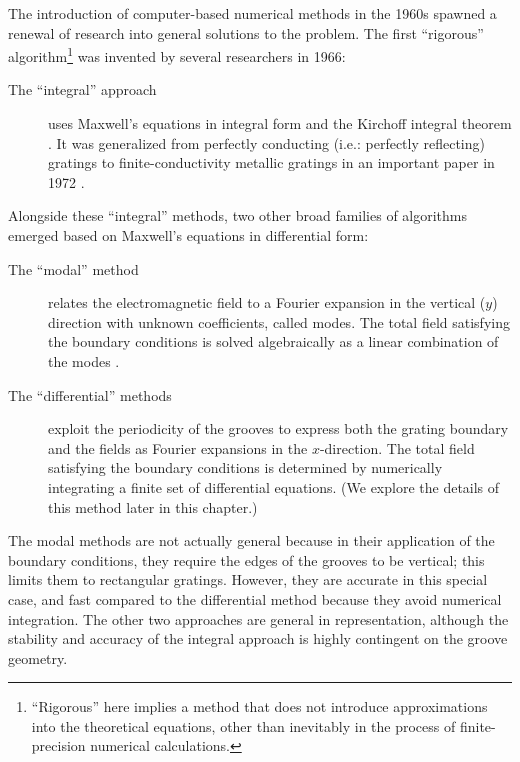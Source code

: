 The introduction of computer-based numerical methods in the 1960s spawned a renewal of research into general solutions to the problem.  The first ``rigorous'' algorithm\footnote{``Rigorous'' here implies a method that does not introduce approximations into the theoretical equations, other than inevitably in the process of finite-precision numerical calculations.} was invented by several researchers in 1966:
\begin{description}
\item[The ``integral'' approach] uses Maxwell's equations in integral form and the Kirchoff integral theorem \cite{Pet66}\cite{Wir69}\cite{Pav70}.  It was generalized from perfectly conducting (i.e.: perfectly reflecting) gratings to finite-conductivity metallic gratings in an important paper in 1972 \cite{May72}.
\end{description}
Alongside these ``integral'' methods, two other broad families of algorithms emerged based on Maxwell's equations in differential form:
\begin{description}
\item[The ``modal'' method] relates the electromagnetic field to a Fourier expansion in the vertical ($y$) direction with unknown coefficients, called modes. The total field satisfying the boundary conditions is solved algebraically as a linear combination of the modes \cite{Bot81}\cite{Bot81a}\cite{And81}.
\item[The ``differential'' methods] exploit the periodicity of the grooves to express both the grating boundary and the fields as Fourier expansions in the $x$-direction. The total field satisfying the boundary conditions is determined by numerically integrating a finite set of differential equations. (We explore the details of this method later in this chapter.)
\end{description}
The modal methods are not actually general because in their application of the boundary conditions, they require the edges of the grooves to be vertical; this limits them to rectangular gratings.  However, they are accurate in this special case, and fast compared to the differential method because they avoid numerical integration.  
The other two approaches are general in representation, although the stability and accuracy of the integral approach is highly contingent on the groove geometry.

